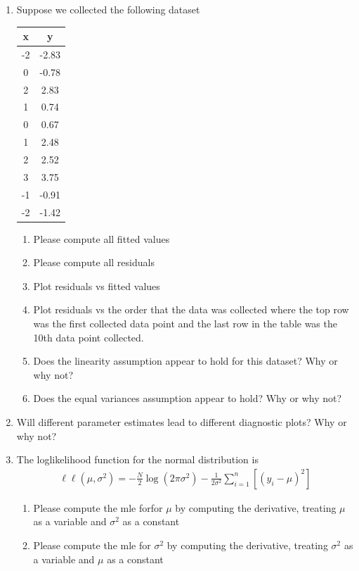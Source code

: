 \begin{enumerate}
    \item Suppose we collected the following dataset
    \begin{table}[ht!]
        \centering
        \begin{tabular}{c|c}
            x & y \\
            \hline
            -2  & -2.83  \\ 
            0   &  -0.78 \\ 
            2   &  2.83  \\ 
            1   &  0.74  \\ 
            0   &  0.67  \\ 
            1   &  2.48  \\ 
            2   &  2.52  \\ 
            3   &  3.75  \\ 
            -1  &  -0.91 \\ 
            -2  &  -1.42 \\ 
        \end{tabular}
    \end{table}
    \begin{enumerate}
        \item Please compute all fitted values
        \item Please compute all residuals
        \item Plot residuals vs fitted values
        \item Plot residuals vs the order that the data was collected where the top row was the first collected data point and the last row in the table was the 10th data point collected. 
        \item Does the linearity assumption appear to hold for this dataset? Why or why not?
        \item Does the equal variances assumption appear to hold? Why or why not?
    \end{enumerate}
    
    \item Will different parameter estimates lead to different diagnostic plots? Why or why not?
    
    \item The loglikelihood function for the normal distribution is
    \begin{align}
         \ell \ell(\mu, \sigma^{2}) = - \frac{N}{2} \log \left(2 \pi \sigma^{2}\right) - \frac{1}{2 \sigma^{2}} \sum_{i=1}^{n} \left[   \left (y_{i} - \mu \right)^{2} \right]
    \end{align}
    \begin{enumerate}
        \item Please compute the mle forfor $\mu$ by computing the derivative, treating $\mu$ as a variable and $\sigma^{2}$ as a constant 
        \item Please compute the mle for $\sigma^{2}$ by computing the derivative, treating $\sigma^{2}$ as a variable and $\mu$ as a constant 
    \end{enumerate}
    

\end{enumerate}

